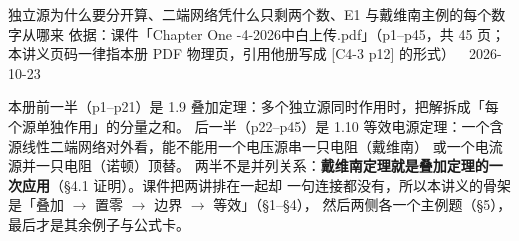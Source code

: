 \documentclass[11pt]{ctexart}
\begin{document}
{独立源为什么要分开算、二端网络凭什么只剩两个数、E1 与戴维南主例的每个数字从哪来}
{依据：课件「Chapter One -4-2026中白上传.pdf」（p1--p45，共 45 页；本讲义页码一律指本册 PDF 物理页，引用他册写成 [C4-3 p12] 的形式）\ \textperiodcentered\ 2026-10-23}



本册前一半（p1--p21）是 1.9 叠加定理：多个独立源同时作用时，把解拆成「每个源单独作用」的分量之和。
后一半（p22--p45）是 1.10 等效电源定理：一个含源线性二端网络对外看，能不能用一个电压源串一只电阻（戴维南）
或一个电流源并一只电阻（诺顿）顶替。
两半不是并列关系：\textbf{戴维南定理就是叠加定理的一次应用}（§4.1 证明）。课件把两讲排在一起却
一句连接都没有，所以本讲义的骨架是「叠加 $\to$ 置零 $\to$ 边界 $\to$ 等效」（§1--§4），
然后两侧各一个主例题（§5），最后才是其余例子与公式卡。
\end{document}
